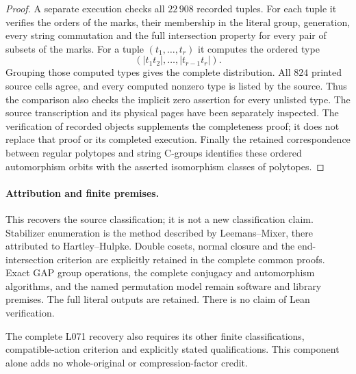 \documentclass[11pt,a4paper]{article}
\begin{document}
\begin{proof}
A separate execution checks all $22\,908$ recorded tuples. For
each tuple it verifies the orders of the marks, their membership
in the literal group, generation, every string commutation and
the full intersection property for every pair of subsets of the
marks. For a tuple $(t_1,\ldots,t_r)$ it computes the ordered type
\[
              (|t_1t_2|,\ldots,|t_{r-1}t_r|).
\]
Grouping those computed types gives the complete distribution.
All $824$ printed source cells agree, and every computed nonzero
type is listed by the source. Thus the comparison also checks the
implicit zero assertion for every unlisted type. The source
transcription and its physical pages have been separately inspected.
The verification of recorded objects supplements the completeness
proof; it does not replace that proof or its completed execution.
Finally the retained correspondence between regular polytopes and
string C-groups identifies these ordered automorphism orbits with
the asserted isomorphism classes of polytopes.
\end{proof}

\paragraph{Attribution and finite premises.}
This recovers the source classification; it is not a new classification
claim. Stabilizer enumeration is the method described by Leemans--Mixer,
there attributed to Hartley--Hulpke. Double cosets, normal closure and
the end-intersection criterion are explicitly retained in the complete
common proofs. Exact GAP group operations, the complete conjugacy and
automorphism algorithms, and the named permutation model remain
software and library premises. The full literal outputs are retained.
There is no claim of Lean verification.

The complete L071 recovery also requires its other finite classifications,
compatible-action criterion and explicitly stated qualifications. This
component alone adds no whole-original or compression-factor credit.
\end{document}
